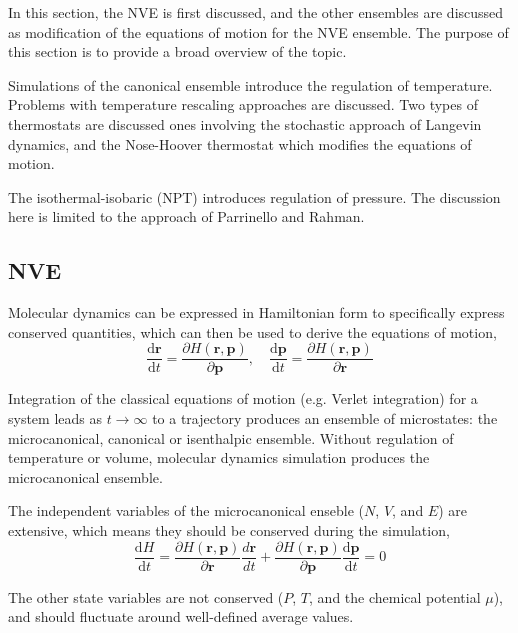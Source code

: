   In this section, the NVE is first discussed, and the other ensembles are discussed as modification of the equations of motion for the NVE ensemble.  The purpose of this section is to provide a broad overview of the topic.

Simulations of the canonical ensemble introduce the regulation of temperature.  Problems with temperature rescaling approaches are discussed.  Two types of thermostats are discussed ones involving the stochastic approach of Langevin dynamics, and the Nose-Hoover thermostat\cite{hoover1985_npt} which modifies the equations of motion.

The isothermal-isobaric (NPT) introduces regulation of pressure.  The discussion here is limited to the approach of Parrinello and Rahman\cite{parrinello1981_barostat}.

\subsection{NVE}
Molecular dynamics can be expressed in Hamiltonian form to specifically express conserved quantities\cite{allen1987_md}, which can then be used to derive the equations of motion,
\begin{equation}
	\frac{\mathrm{d} \bm{r}}
	     {\mathrm{d} t}
	=
	\frac{\partial H(\bm{r},\bm{p})}
	     {\partial \bm{p}},
	\quad
	\frac{\mathrm{d} \bm{p}}
	     {\mathrm{d} t}
	=
	\frac{\partial H(\bm{r},\bm{p})}
	     {\partial \bm{r}}
\end{equation}

Integration of the classical equations of motion (e.g. Verlet integration) for a system leads as {$t \rightarrow \infty$} to a trajectory produces an ensemble of microstates: the microcanonical, canonical or isenthalpic ensemble.  Without regulation of temperature or volume, molecular dynamics simulation produces the microcanonical ensemble.

  The independent variables of the microcanonical enseble ($N$, $V$, and $E$) are extensive, which means they should be conserved during the simulation,
\begin{equation}
	\frac{\mathrm{d} H}
	     {\mathrm{d} t}
	=
	\frac{\partial H(\bm{r},\bm{p})}
	     {\partial \bm{r}} \frac{d\bm{r}}{dt}
	+
	\frac{\partial H(\bm{r},\bm{p})}
	     {\partial \bm{p}}
	\frac{\mathrm{d} \bm{p}}
	     {\mathrm{d} t}
	= 0
\end{equation}

  The other state variables are not conserved ($P$, $T$, and the chemical potential $\mu$), and should fluctuate around well-defined average values.


